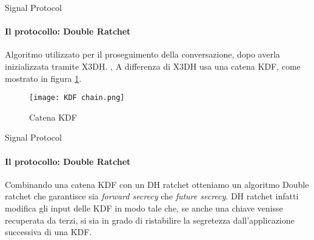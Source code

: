 \begin{frame}{Signal Protocol}
    \framesubtitle{Il protocollo: Double Ratchet}

    Algoritmo utilizzato per il proseguimento della conversazione, dopo averla inizializzata tramite X3DH.\newline\pause
    \cite{doubleratchet}, \cite{VanDam} \newline   
    A differenza di X3DH usa una catena KDF, come mostrato in figura \ref{tag: KDF chain}.

    \begin{figure}
        \texttt{[image: KDF chain.png]}
        \caption{Catena KDF}
        \label{tag: KDF chain}
    \end{figure}

\end{frame}

\begin{frame}{Signal Protocol}
    \framesubtitle{Il protocollo: Double Ratchet}

    Combinando una catena KDF con un DH ratchet otteniamo un algoritmo Double ratchet che garantisce sia \textit{forward secrecy} che \textit{future secrecy}. \newline\pause
    DH ratchet infatti modifica gli input delle KDF in modo tale che, se anche una chiave venisse recuperata da terzi, si sia in grado di ristabilire la segretezza dall'applicazione successiva di una KDF.\newline
\end{frame}

